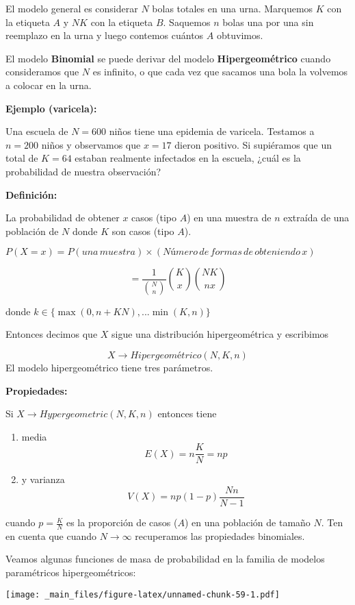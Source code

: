 \documentclass[
]{book}
\begin{document}
El modelo general es considerar \(N\) bolas totales en una urna. Marquemos \(K\) con la etiqueta \(A\) y \(NK\) con la etiqueta \(B\). Saquemos \(n\) bolas una por una sin reemplazo en la urna y luego contemos cuántos \(A\) obtuvimos.

El modelo \textbf{Binomial} se puede derivar del modelo \textbf{Hipergeométrico} cuando consideramos que \(N\) es infinito, o que cada vez que sacamos una bola la volvemos a colocar en la urna.

\textbf{Ejemplo (varicela):}

Una escuela de \(N=600\) niños tiene una epidemia de varicela. Testamos a \(n=200\) niños y observamos que \(x=17\) dieron positivo. Si supiéramos que un total de \(K=64\) estaban realmente infectados en la escuela, ¿cuál es la probabilidad de nuestra observación?

\textbf{Definición:}

La probabilidad de obtener \(x\) casos (tipo \(A\)) en una muestra de \(n\) extraída de una población de \(N\) donde \(K\) son casos (tipo \(A\)).

\(P(X=x)=P(una\,muestra) \times (Número\, de\, formas\, de\, obteniendo\, x)\)

\[=\frac{1}{\binom N n}\binom K x \binom {NK} {nx}\]

donde \(k \in \{\max(0, n+KN), ... \min(K, n) \}\)

Entonces decimos que \(X\) sigue una distribución hipergeométrica y escribimos

\[X \rightarrow Hipergeométrico(N,K,n)\]
El modelo hipergeométrico tiene tres parámetros.

\textbf{Propiedades:}

Si \(X \rightarrow Hypergeometric(N,K,n)\) entonces tiene

\begin{enumerate}
\def\labelenumi{\arabic{enumi})}
\item
  media \[E(X) = n \frac{K}{N} = np\]
\item
  y varianza \[V(X) = np(1-p)\frac{Nn}{N-1}\]
\end{enumerate}

cuando \(p=\frac{K}{N}\) es la proporción de casos (\(A\)) en una población de tamaño \(N\). Ten en cuenta que cuando \(N \rightarrow \infty\) recuperamos las propiedades binomiales.

Veamos algunas funciones de masa de probabilidad en la familia de modelos paramétricos hipergeométricos:

\texttt{[image: \_main\_files/figure-latex/unnamed-chunk-59-1.pdf]}
\end{document}
